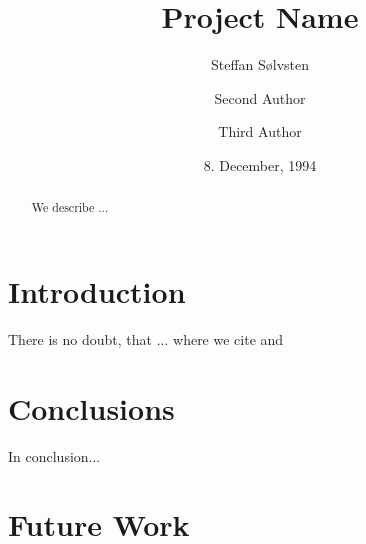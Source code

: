 \documentclass[a4, english, twoside]{article}
\begin{document}
\title{Project Name}

\author{Steffan Sølvsten}
\author{Second Author}
\author{Third Author}

\date{8. December, 1994}

\maketitle

\begin{abstract}
  We describe ...
\end{abstract}

\tableofcontents

\newpage
\section{Introduction} \label{sec:introduction}
There is no doubt, that ... where we cite \cite{doe10a} \cite{doe10b} and \cite{website}

\section{Conclusions} \label{sec:conclusions}
In conclusion...

\section{Future Work} \label{sec:future_work}

\clearpage
\printbibliography
\end{document}
